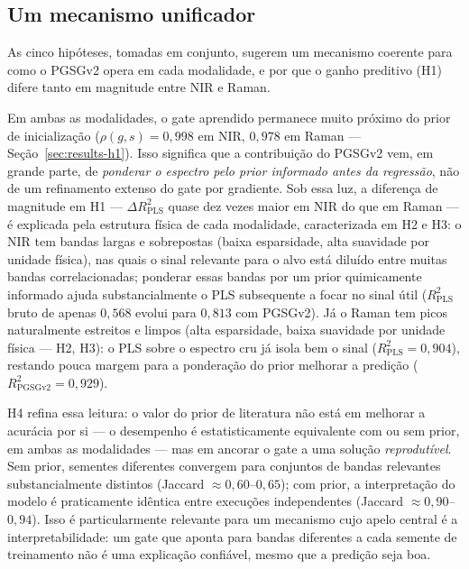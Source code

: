 \subsection{Um mecanismo unificador}

As cinco hipóteses, tomadas em conjunto, sugerem um mecanismo coerente para como o PGSGv2 opera em cada modalidade, e por que o ganho preditivo (H1) difere tanto em magnitude entre NIR e Raman.

Em ambas as modalidades, o gate aprendido permanece muito próximo do prior de inicialização ($\rho(g,s)=0{,}998$ em NIR, $0{,}978$ em Raman --- Seção~\ref{sec:results-h1}). Isso significa que a contribuição do PGSGv2 vem, em grande parte, de \emph{ponderar o espectro pelo prior informado antes da regressão}, não de um refinamento extenso do gate por gradiente. Sob essa luz, a diferença de magnitude em H1 --- $\Delta R^2_{\text{PLS}}$ quase dez vezes maior em NIR do que em Raman --- é explicada pela estrutura física de cada modalidade, caracterizada em H2 e H3: o NIR tem bandas largas e sobrepostas (baixa esparsidade, alta suavidade por unidade física), nas quais o sinal relevante para o alvo está diluído entre muitas bandas correlacionadas; ponderar essas bandas por um prior quimicamente informado ajuda substancialmente o PLS subsequente a focar no sinal útil ($R^2_{\text{PLS}}$ bruto de apenas $0{,}568$ evolui para $0{,}813$ com PGSGv2). Já o Raman tem picos naturalmente estreitos e limpos (alta esparsidade, baixa suavidade por unidade física --- H2, H3): o PLS sobre o espectro cru já isola bem o sinal ($R^2_{\text{PLS}}=0{,}904$), restando pouca margem para a ponderação do prior melhorar a predição ($R^2_{\text{PGSGv2}}=0{,}929$).

H4 refina essa leitura: o valor do prior de literatura não está em melhorar a acurácia por si --- o desempenho é estatisticamente equivalente com ou sem prior, em ambas as modalidades --- mas em ancorar o gate a uma solução \emph{reprodutível}. Sem prior, sementes diferentes convergem para conjuntos de bandas relevantes substancialmente distintos (Jaccard $\approx 0{,}60$--$0{,}65$); com prior, a interpretação do modelo é praticamente idêntica entre execuções independentes (Jaccard $\approx 0{,}90$--$0{,}94$). Isso é particularmente relevante para um mecanismo cujo apelo central é a interpretabilidade: um gate que aponta para bandas diferentes a cada semente de treinamento não é uma explicação confiável, mesmo que a predição seja boa.

